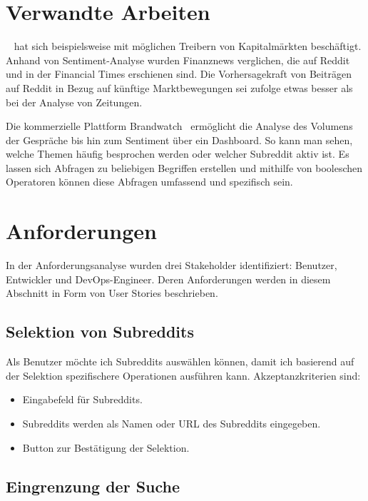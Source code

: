 \documentclass[a4paper, 10pt, conference]{IEEEtran}
\begin{document}
\section{Verwandte Arbeiten} \label{s:verwandte_arbeiten}

\citeauthor{lubitz2017}~\cite{lubitz2017} hat sich beispielsweise mit möglichen Treibern von Kapitalmärkten beschäftigt. Anhand von Sentiment-Analyse wurden Finanznews verglichen, die auf Reddit und in der Financial Times erschienen sind. Die Vorhersagekraft von Beiträgen auf Reddit in Bezug auf künftige Marktbewegungen sei \citeauthor{lubitz2017} zufolge etwas besser als bei der Analyse von Zeitungen.

Die kommerzielle Plattform Brandwatch~\cite{brandwatch} ermöglicht die Analyse des Volumens der Gespräche bis hin zum Sentiment über ein Dashboard. So kann man sehen, welche Themen häufig besprochen werden oder welcher Subreddit aktiv ist. Es lassen sich Abfragen zu beliebigen Begriffen erstellen und mithilfe von booleschen Operatoren können diese Abfragen umfassend und spezifisch sein.


\section{Anforderungen} \label{s:anforderungen}

In der Anforderungsanalyse wurden drei Stakeholder identifiziert: Benutzer, Entwickler und DevOps-Engineer. Deren Anforderungen werden in diesem Abschnitt in Form von User Stories beschrieben.

\subsection{Selektion von Subreddits}

Als Benutzer möchte ich Subreddits auswählen können, damit ich basierend auf der Selektion spezifischere Operationen ausführen kann. Akzeptanzkriterien sind:
\begin{itemize}
\item Eingabefeld für Subreddits.
\item Subreddits werden als Namen oder URL des Subreddits eingegeben.
\item Button zur Bestätigung der Selektion.
\end{itemize}

\subsection{Eingrenzung der Suche}
\end{document}
